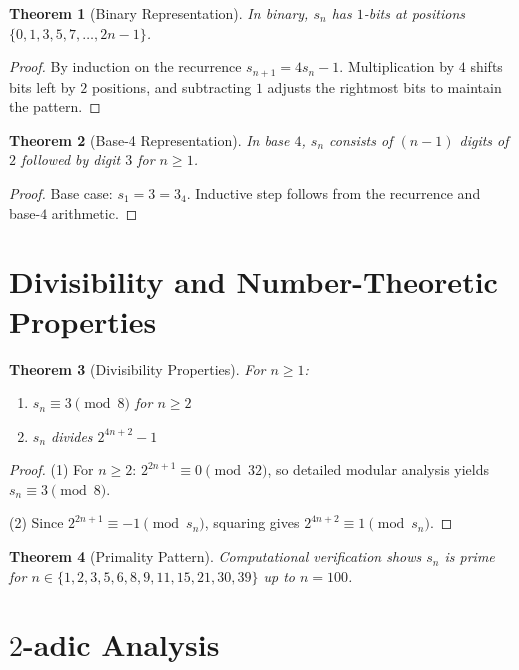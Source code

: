 \documentclass[11pt]{article}
\newtheorem{theorem}{Theorem}
\theoremstyle{remark}
\begin{document}
\begin{theorem}[Binary Representation]
In binary, $s_n$ has $1$-bits at positions $\{0, 1, 3, 5, 7, \ldots, 2n-1\}$.
\end{theorem}

\begin{proof}
By induction on the recurrence $s_{n+1} = 4s_n - 1$. Multiplication by $4$ shifts bits left by $2$ positions, and subtracting $1$ adjusts the rightmost bits to maintain the pattern.
\end{proof}

\begin{theorem}[Base-4 Representation]
In base $4$, $s_n$ consists of $(n-1)$ digits of $2$ followed by digit $3$ for $n \geq 1$.
\end{theorem}

\begin{proof}
Base case: $s_1 = 3 = 3_4$. Inductive step follows from the recurrence and base-$4$ arithmetic.
\end{proof}

\section{Divisibility and Number-Theoretic Properties}

\begin{theorem}[Divisibility Properties]
For $n \geq 1$:
\begin{enumerate}
\item $s_n \equiv 3 \pmod{8}$ for $n \geq 2$
\item $s_n$ divides $2^{4n+2} - 1$
\end{enumerate}
\end{theorem}

\begin{proof}
(1) For $n \geq 2$: $2^{2n+1} \equiv 0 \pmod{32}$, so detailed modular analysis yields $s_n \equiv 3 \pmod{8}$.

(2) Since $2^{2n+1} \equiv -1 \pmod{s_n}$, squaring gives $2^{4n+2} \equiv 1 \pmod{s_n}$.
\end{proof}

\begin{theorem}[Primality Pattern]
Computational verification shows $s_n$ is prime for $n \in \{1, 2, 3, 5, 6, 8, 9, 11, 15, 21, 30, 39\}$ up to $n = 100$.
\end{theorem}

\section{$2$-adic Analysis}
\end{document}
